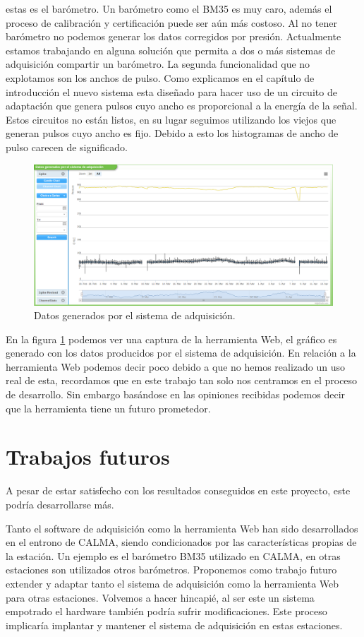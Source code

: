 	estas es el barómetro. Un barómetro como el BM35 es muy caro, además el proceso de calibración y certificación puede ser aún más costoso. Al
	no tener barómetro no podemos generar los datos corregidos por presión. Actualmente estamos trabajando en alguna solución que permita a dos o
	más sistemas de adquisición compartir un barómetro. La segunda funcionalidad que no explotamos son los anchos de pulso. Como explicamos en el
	capítulo de introducción el nuevo sistema esta diseñado para hacer uso de un circuito de adaptación que genera pulsos cuyo ancho es
	proporcional a la energía de la señal. Estos circuitos no están listos, en su lugar seguimos utilizando los viejos que generan pulsos cuyo
	ancho es fijo. Debido a esto los histogramas de ancho de pulso carecen de significado. 
	\begin{figure}[h]
		\centering
		\includegraphics[keepaspectratio, width=1\textwidth]{./img/resultados.png}
		\caption{Datos generados por el sistema de adquisición.}   
		\label{fig:resultados}
	\end{figure}
	\par
	En la figura \ref{fig:resultados} podemos ver una captura de la herramienta Web, el gráfico es generado con los datos producidos por el
	sistema de adquisición. En relación a la herramienta Web podemos decir poco debido a que no hemos realizado un uso real de esta, recordamos
	que en este trabajo tan solo nos centramos en el proceso de desarrollo. Sin embargo basándose en las opiniones recibidas podemos decir que la
	herramienta tiene un futuro prometedor.

\section{Trabajos futuros}
	A pesar de estar satisfecho con los resultados conseguidos en este proyecto, este podría desarrollarse más.
	\par
	Tanto el software de adquisición como la herramienta Web han sido desarrollados en el entrono de CALMA, siendo condicionados por las
	características propias de la estación. Un ejemplo es el barómetro BM35 utilizado en CALMA, en otras estaciones son utilizados otros
	barómetros. Proponemos como trabajo futuro extender y adaptar tanto el sistema de adquisición como la herramienta Web para otras estaciones.
	Volvemos a hacer hincapié, al ser este un sistema empotrado el hardware también podría sufrir modificaciones. Este proceso implicaría
	implantar y mantener el sistema de adquisición en estas estaciones.
